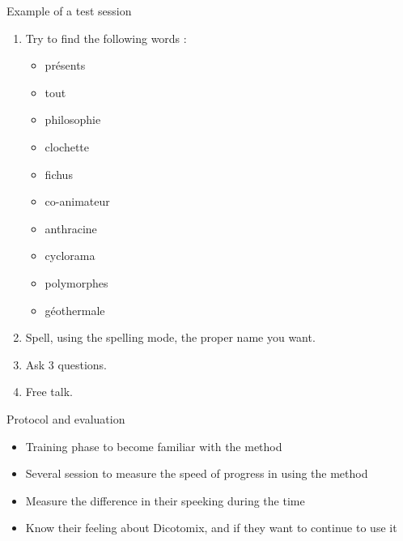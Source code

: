 \documentclass[graphics]{beamer}
\begin{document}

\begin{frame}{Example of a test session}
	\begin{enumerate}
		\item Try to find the following words :
			\begin{itemize}
			\item présents
			\item tout
			\item philosophie
			\item clochette
			\item fichus
			\item co-animateur
			\item anthracine
			\item cyclorama
			\item polymorphes
			\item géothermale
		\end{itemize}
	\pause
	\item Spell, using the spelling mode, the proper name you want.
	\pause
	\item Ask 3 questions.
	\pause
	\item Free talk.
	\end{enumerate}
\end{frame}

\begin{frame}{Protocol and evaluation}
	\begin{itemize}
		\item Training phase to become familiar with the method
		\item Several session to measure the speed of progress in using the method
		\item Measure the difference in their speeking during the time
		\item Know their feeling about Dicotomix, and if they want to continue to use it
	\end{itemize}
\end{frame}
\end{document}
